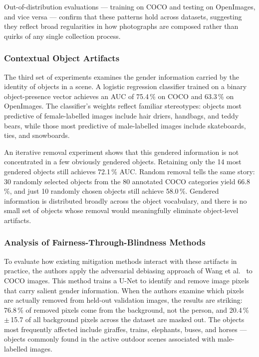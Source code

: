 Out-of-distribution evaluations --- training on COCO and testing on OpenImages, and vice
versa --- confirm that these patterns hold across datasets, suggesting they reflect broad
regularities in how photographs are composed rather than quirks of any single collection
process.

\subsubsection*{Contextual Object Artifacts}

The third set of experiments examines the gender information carried by the identity of
objects in a scene.  A logistic regression classifier trained on a binary object-presence
vector achieves an AUC of 75.4\,\% on COCO and 63.3\,\% on OpenImages.  The classifier's
weights reflect familiar stereotypes: objects most predictive of female-labelled images
include hair driers, handbags, and teddy bears, while those most predictive of male-labelled
images include skateboards, ties, and snowboards.

An iterative removal experiment shows that this gendered information is not concentrated in a
few obviously gendered objects.  Retaining only the 14 most gendered objects still achieves
72.1\,\% AUC.  Random removal tells the same story: 30 randomly selected objects from the
80 annotated COCO categories yield 66.8\,\%, and just 10 randomly chosen objects still
achieve 58.0\,\%.  Gendered information is distributed broadly across the object vocabulary,
and there is no small set of objects whose removal would meaningfully eliminate object-level
artifacts.

\subsubsection*{Analysis of Fairness-Through-Blindness Methods}

To evaluate how existing mitigation methods interact with these artifacts in practice, the
authors apply the adversarial debiasing approach of Wang et
al.~\cite{Wang_2019_BalancedDatasetsNotEnough} to COCO images.  This method trains a U-Net to
identify and remove image pixels that carry salient gender information.  When the authors
examine which pixels are actually removed from held-out validation images, the results are
striking: 76.8\,\% of removed pixels come from the background, not the person, and 20.4\,\%
$\pm$\,15.7 of all background pixels across the dataset are masked out.  The objects most
frequently affected include giraffes, trains, elephants, buses, and horses --- objects
commonly found in the active outdoor scenes associated with male-labelled images.

